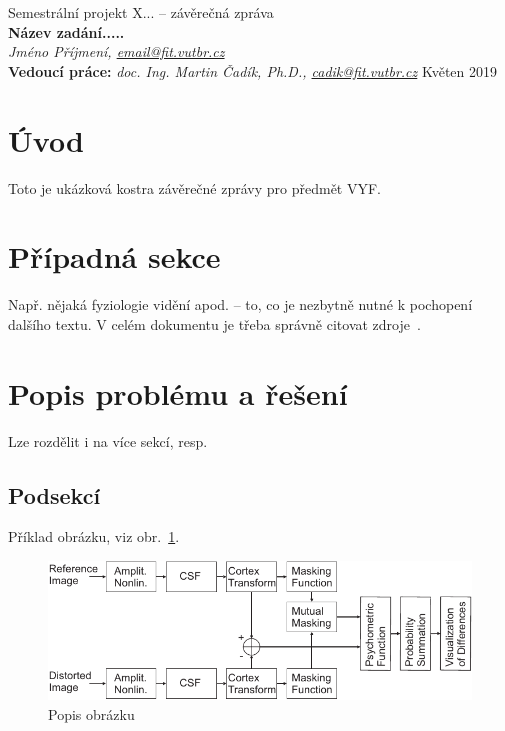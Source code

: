 \documentclass[11pt,a4paper,oneside]{article}
\begin{document}
\thispagestyle{empty}
\begin{center}
\vspace*{60mm}
{Semestrální projekt X... -- závěrečná zpráva }\\
\smallskip
{\Large\bf Název zadání.....}\\
\smallskip
{\it Jméno Příjmení, \url{email@fit.vutbr.cz}}\\
\vfill
{\bf Vedoucí práce:} {\it doc. Ing. Martin Čadík, Ph.D., \url{cadik@fit.vutbr.cz}} 
\hfill {Květen 2019}



\end{center}
\newpage


\section{Úvod}
Toto je ukázková kostra závěrečné zprávy pro předmět VYF.



\section{Případná sekce}
Např. nějaká fyziologie vidění apod. -- to, co je nezbytně nutné k pochopení
dalšího textu. V celém dokumentu je třeba správně citovat 
zdroje~\cite{Daly:1993:VDP:197765.197783}.


\section{Popis problému a řešení}
Lze rozdělit i na více sekcí, resp. 

\subsection{Podsekcí}
Příklad obrázku, viz obr.~\ref{fig:vdp}.


\begin{figure}[htb]
  \begin{center}
    \includegraphics{fig/vdp}
    \caption{Popis obrázku} 
    \label{fig:vdp}
  \end{center}
\end{figure}
\end{document}
